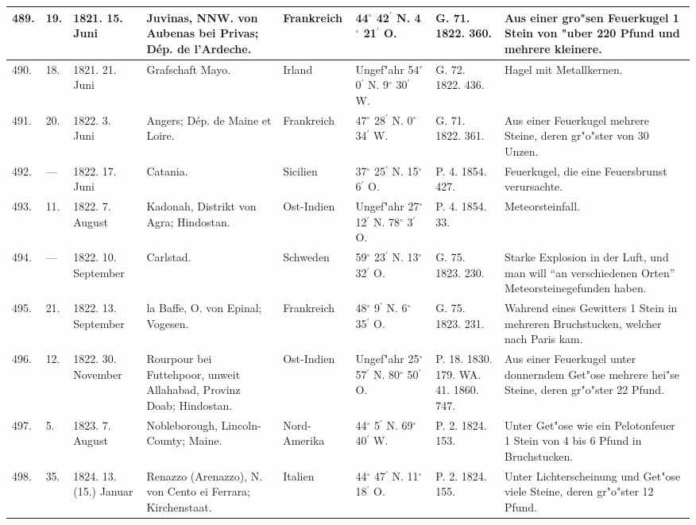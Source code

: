 \documentclass[a4paper, 8pt, oneside, polutonikogreek, german]{article}
\begin{document}
\begin{center}
\begin{longtable}{| p{4mm} | p{2mm} | p{15mm} | p{25mm} | p{16mm} | p{12mm} | p{13mm} | p{20mm} |}
        489. & 19. & 1821. 15. Juni & Juvinas, NNW. von Aubenas bei Privas; Dép. de l’Ardeche. & Frankreich & 44$^\circ$ 42$^\prime$ N. 4$^\circ$ 21$^\prime$ O. & G. 71. 1822. 360. & Aus einer gro"sen Feuerkugel 1 Stein von "uber 220 Pfund und mehrere kleinere. \\ \hline
        490. & 18. & 1821. 21. Juni & Grafschaft Mayo. & Irland & Ungef"ahr 54$^\circ$ 0$^\prime$ N. 9$^\circ$ 30$^\prime$ W. & G. 72. 1822. 436. & Hagel mit Metallkernen. \\ \hline
        491. & 20. & 1822. 3. Juni & Angers; Dép. de Maine et Loire. & Frankreich & 47$^\circ$ 28$^\prime$ N. 0$^\circ$ 34$^\prime$ W. & G. 71. 1822. 361. & Aus einer Feuerkugel mehrere Steine, deren gr"o"ster von 30 Unzen. \\ \hline
        492. & --- & 1822. 17. Juni & Catania. & Sicilien & 37$^\circ$ 25$^\prime$ N. 15$^\circ$ 6$^\prime$ O. & P. 4. 1854. 427. & Feuerkugel, die eine Feuersbrunst verursachte. \\ \hline
        493. & 11. & 1822. 7. August & Kadonah, Distrikt von Agra; Hindostan. & Ost-Indien & Ungef"ahr 27$^\circ$ 12$^\prime$ N. 78$^\circ$ 3$^\prime$ O. & P. 4. 1854. 33. & Meteorsteinfall. \\ \hline
        494. & --- & 1822. 10. September & Carlstad. & Schweden & 59$^\circ$ 23$^\prime$ N. 13$^\circ$ 32$^\prime$ O. & G. 75. 1823. 230. & Starke Explosion in der Luft, und man will "`an verschiedenen Orten"' Meteorsteinegefunden haben. \\ \hline
        495. & 21. & 1822. 13. September & la Baffe, O. von Epinal; Vogesen. & Frankreich & 48$^\circ$ 9$^\prime$ N. 6$^\circ$ 35$^\prime$ O. & G. 75. 1823. 231. & Wahrend eines Gewitters 1 Stein in mehreren Bruchstucken, welcher nach Paris kam. \\ \hline
        496. & 12. & 1822. 30. November & Rourpour bei Futtehpoor, unweit Allahabad, Provinz Doab; Hindostan. & Ost-Indien & Ungef"ahr 25$^\circ$ 57$^\prime$ N. 80$^\circ$ 50$^\prime$ O. & P. 18. 1830. 179. WA. 41. 1860. 747. & Aus einer Feuerkugel unter donnerndem Get"ose mehrere hei"se Steine, deren gr"o"ster 22 Pfund. \\ \hline
        497. & 5. & 1823. 7. August & Nobleborough, Lincoln-County; Maine. & Nord-Amerika & 44$^\circ$ 5$^\prime$ N. 69$^\circ$ 40$^\prime$ W. & P. 2. 1824. 153. & Unter Get"ose wie ein Pelotonfeuer 1 Stein von 4 bis 6 Pfund in Bruchstucken. \\ \hline
        498. & 35. & 1824. 13. (15.) Januar & Renazzo (Arenazzo), N. von Cento ei Ferrara; Kirchenstaat. & Italien & 44$^\circ$ 47$^\prime$ N. 11$^\circ$ 18$^\prime$ O. & P. 2. 1824. 155. & Unter Lichterscheinung und Get"ose viele Steine, deren gr"o"ster 12 Pfund. \\ \hline

\end{longtable}
\end{center}
\end{document}
